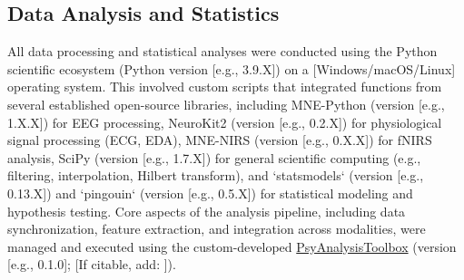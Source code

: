 \subsection{Data Analysis and Statistics}
All data processing and statistical analyses were conducted using the Python scientific ecosystem (Python version [e.g., 3.9.X]) \parencite{harrisArrayProgrammingNumPy2020, virtanenSciPy10Fundamental2020} on a [Windows/macOS/Linux] operating system. This involved custom scripts that integrated functions from several established open-source libraries, including MNE-Python (version [e.g., 1.X.X]) \parencite{gramfortMEGEEGData2013} for \gls{EEG} processing, NeuroKit2 (version [e.g., 0.2.X]) \parencite{makowskiNeuroKit2PythonToolbox2021} for physiological signal processing (\gls{ECG}, \gls{EDA}), MNE-NIRS (version [e.g., 0.X.X]) \parencite{yucelBestPracticesFNIRS2021} for \gls{fNIRS} analysis, SciPy (version [e.g., 1.7.X]) \parencite{virtanenSciPy10Fundamental2020} for general scientific computing (e.g., filtering, interpolation, Hilbert transform), and `statsmodels` (version [e.g., 0.13.X]) \parencite{seaboldStatsmodelsEconometricStatistical2010} and `pingouin` (version [e.g., 0.5.X]) \parencite{vallatPingouinStatisticsPython2018} for statistical modeling and hypothesis testing. Core aspects of the analysis pipeline, including data synchronization, feature extraction, and integration across modalities, were managed and executed using the custom-developed \href{https://github.com/YourGitHubUser/YourRepoName}{PsyAnalysisToolbox} (version [e.g., 0.1.0]; [If citable, add: \textcite{YourToolboxCitationPlaceholder}]).
